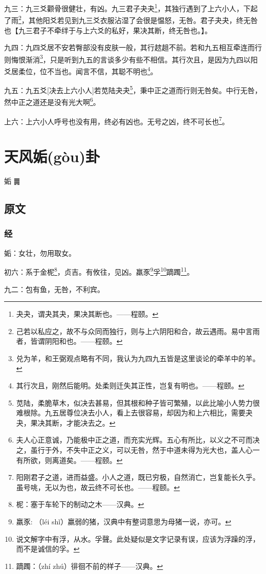 \documentclass[12pt,oneside]{book}
\begin{document}
九三：九三爻颧骨很健壮，有凶。九三君子夬夬\footnote{夬夬，谓夬其夬，果决其断也。——程颐。}，其独行遇到了上六小人，下起了雨\footnote{己若以私应之，故不与众同而独行，则与上六阴阳和合，故云遇雨。易中言雨者，皆谓阴阳和也。——程颐。}，其他阳爻若见到九三爻衣服沾湿了会很是愠怒，无咎。君子夬夬，终无咎也【九三君子不牵绊于与上六爻的私好，果决其断，终无咎也。】。

九四：九四爻居不安若臀部没有皮肤一般，其行趑趄不前。若和九五相互牵连而行则悔恨渐消\footnote{兑为羊，和王弼观点略有不同，我认为九四九五皆是这里谈论的牵羊中的羊。}，只是听到九五的言谈多少有些不相信。其行次且，是因为九四以阳爻居柔位，位不当也。闻言不信，其聪不明也\footnote{其行次且，刚然后能明。处柔则迁失其正性，岂复有明也。——程颐。}。

九五：九五爻[决去上六小人]若苋陆夬夬\footnote{苋陆，柔脆草木，似决去甚易，但其根和种子皆可繁殖，以此比喻小人势力很难根除。九五居尊位决去小人，看上去很容易，却因为和上六相比，需要夬夬，果决其断，才能决去之。}，秉中正之道而行则无咎矣。中行无咎，然中正之道还是没有光大啊\footnote{夫人心正意诚，乃能极中正之道，而充实光辉。五心有所比，以义之不可而决之，虽行于外，不失中正之义，可以无咎，然于中道未得为光大也，盖人心一有所欲，则离道矣。——程颐。}。

上六：上六小人呼号也没有用，终必有凶也。无号之凶，终不可长也\footnote{阳刚君子之道，进而益盛。小人之道，既已穷极，自然消亡，岂复能长久乎。虽号咷，无以为也，故云终不可长也。——程颐。}。



\chapter{天风姤(gòu)卦}
姤 {\Large ䷫}

\section{原文}

\subsection{经}
姤：女壮，勿用取女。

初六：系于金柅\footnote{柅：塞于车轮下的制动之木——汉典。}，贞吉。有攸往，见凶。羸豕\footnote{羸豕: （léi shǐ）羸弱的猪，汉典中有整词意思为母猪一说，亦可。}孚\footnote{说文解字中有浮，从水。孚聲。此处疑似是文字记录有误，应该为浮躁的浮，而不是诚信的孚。}蹢躅\footnote{蹢躅：（zhí zhú）徘徊不前的样子——汉典。}。

九二：包有鱼，无咎，不利宾。
\end{document}
